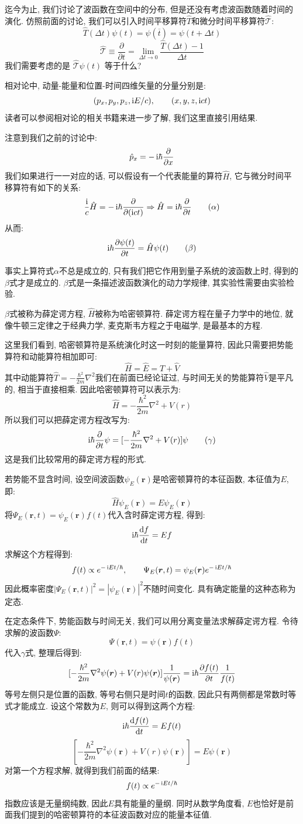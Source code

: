 迄今为止, 我们讨论了波函数在空间中的分布, 但是还没有考虑波函数随着时间的演化. 仿照前面的讨论, 我们可以引入时间平移算符$\hat{T}$和微分时间平移算符$\hat{\mathscr{T}}$:
\[
\hat{T}(\Delta t)\psi(t) = \psi(\overline{t}) = \psi(t+\Delta t)
\]
\[
\hat{\mathscr{T}}\equiv \frac{\partial}{\partial t} = \lim_{\Delta t\to 0}\frac{\hat{T}(\Delta t)-1}{\Delta t}
\]
我们需要考虑的是 $\hat{\mathscr{T}}\psi(t)$ 等于什么?

相对论中, 动量-能量和位置-时间四维矢量的分量分别是:
\[
(p_x, p_y, p_z, \mathop{}\!\mathrm{i} E/c), \qquad (x, y, z, \mathop{}\!\mathrm{i} ct)
\]
读者可以参阅相对论的相关书籍来进一步了解, 我们这里直接引用结果.

注意到我们之前的讨论中:
\[
\hat{p}_x = -\mathop{}\!\mathrm{i}\hbar\frac{\partial}{\partial x}
\]
我们如果进行一一对应的话, 可以假设有一个代表能量的算符$\hat{H}$, 它与微分时间平移算符有如下的关系:
\[
\frac{\mathop{}\!\mathrm{i}}{c}\hat{H} = -\mathop{}\!\mathrm{i}\hbar\frac{\partial}{\partial (\mathop{}\!\mathrm{i} c t)} \Rightarrow \hat{H} = \mathop{}\!\mathrm{i}\hbar\frac{\partial}{\partial t} \tag{$\alpha$}
\]
从而:
\[
\mathop{}\!\mathrm{i}\hbar\frac{\partial \psi(t)}{\partial t} = \hat{H}\psi(t) \tag{$\beta$}
\]

事实上算符式$\alpha$不总是成立的, 只有我们把它作用到量子系统的波函数上时, 得到的$\beta$式才是成立的. $\beta$式是一条描述波函数演化的动力学规律, 其实验性需要由实验检验.

$\beta$式被称为薛定谔方程, $\hat{H}$被称为哈密顿算符. 薛定谔方程在量子力学中的地位, 就像牛顿三定律之于经典力学, 麦克斯韦方程之于电磁学, 是最基本的方程.

这里我们看到, 哈密顿算符是系统演化时这一时刻的能量算符, 因此只需要把势能算符和动能算符相加即可:
\[
\hat{H}=\hat{E}=\hat{T}+\hat{V}
\]
其中动能算符$\hat{T}=-\frac{\hbar^2}{2m}\nabla^2$我们在前面已经论证过, 与时间无关的势能算符$\hat{V}$是平凡的, 相当于直接相乘. 因此哈密顿算符可以表示为:
\[
\hat{H} = -\frac{\hbar^2}{2m}\nabla^2+V(r)
\]
所以我们可以把薛定谔方程改写为:
\[
\mathop{}\!\mathrm{i}\hbar\frac{\partial}{\partial t}\psi = [-\frac{\hbar^2}{2m}\nabla^2+V(r)]\psi \tag{$\gamma$}
\]
这是我们比较常用的薛定谔方程的形式.

若势能不显含时间, 设空间波函数$\psi_E(\bm r)$是哈密顿算符的本征函数, 本征值为$E$, 即:
\[
\hat{H}\psi_E(\bm r) = E\psi_E(\bm r)
\]
将$\Psi_E(\bm r,t)=\psi_E(\bm r)f(t)$代入含时薛定谔方程, 得到:
\[
\mathop{}\!\mathrm{i}\hbar\frac{\mathop{}\!\mathrm{d} f}{\mathop{}\!\mathrm{d} t} = Ef
\]
求解这个方程得到:
\[
f(t) \propto e^{-\mathop{}\!\mathrm{i} Et/\hbar}, \qquad \Psi_E(\bm r,t)=\psi_E(\bm r)e^{-\mathop{}\!\mathrm{i} Et/\hbar}
\]
因此概率密度$|\Psi_E(\bm r,t)|^2=|\psi_E(\bm r)|^2$不随时间变化. 具有确定能量的这种态称为定态.

在定态条件下, 势能函数与时间无关, 我们可以用分离变量法求解薛定谔方程. 令待求解的波函数$\Psi$:
\[
\Psi(\bm{r}, t) = \psi(\bm{r})f(t)
\]
代入$\gamma$式, 整理后得到:
\[
[-\frac{\hbar^2}{2m}\nabla^2\psi(\bm{r})+V(r)\psi(\bm{r})]\frac{1}{\psi(\bm{r})} = \mathop{}\!\mathrm{i}\hbar\frac{\partial f(t)}{\partial t}\frac{1}{f(t)}
\]
等号左侧只是位置的函数, 等号右侧只是时间$t$的函数, 因此只有两侧都是常数时等式才能成立. 设这个常数为$E$, 则可以得到这两个方程:
\[
\mathop{}\!\mathrm{i} \hbar \frac{\mathop{}\!\mathrm{d} f(t)}{\mathop{}\!\mathrm{d} t} = Ef(t)
\]
\[
[-\frac{\hbar^2}{2m}\nabla^2\psi(\bm{r})+V(r)\psi(\bm{r})]=  E\psi(\bm{r})
\]
对第一个方程求解, 就得到我们前面的结果:
\[
f(t) \propto e^{-\mathop{}\!\mathrm{i} Et/\hbar}
\]
指数应该是无量纲纯数, 因此$E$具有能量的量纲. 同时从数学角度看, $E$也恰好是前面我们提到的哈密顿算符的本征波函数对应的能量本征值.

